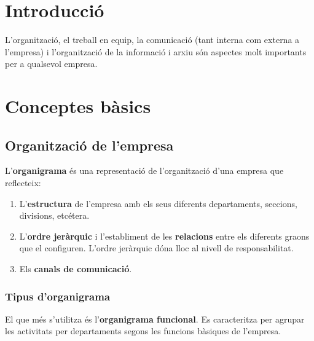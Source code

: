 \documentclass[
]{book}
\author{Fernando Verdú Primo}
\date{2022-01-03}
\begin{document}

\newpage

{
\setcounter{tocdepth}{1}
\tableofcontents
}
\hypertarget{introducciuxf3}{%
\chapter{Introducció}\label{introducciuxf3}}

L'organització, el treball en equip, la comunicació (tant interna com externa a l'empresa) i l'organització de la informació i arxiu són aspectes molt importants per a qualsevol empresa.

\hypertarget{conceptes-buxe0sics}{%
\chapter{Conceptes bàsics}\label{conceptes-buxe0sics}}

\hypertarget{organitzaciuxf3-de-lempresa}{%
\section{Organització de l'empresa}\label{organitzaciuxf3-de-lempresa}}

L'\textbf{organigrama} és una representació de l'organització d'una empresa que reflecteix:

\begin{enumerate}
\def\labelenumi{\alph{enumi}.}
\item
  L'\textbf{estructura} de l'empresa amb els seus diferents departaments, seccions, divisions, etcétera.
\item
  L'\textbf{ordre jeràrquic} i l'establiment de les \textbf{relacions} entre els diferents graons que el configuren. L'ordre jeràrquic dóna lloc al nivell de responsabilitat.
\item
  Els \textbf{canals de comunicació}.
\end{enumerate}

\hypertarget{tipus-dorganigrama}{%
\subsection{Tipus d'organigrama}\label{tipus-dorganigrama}}

El que més s'utilitza és l'\textbf{organigrama funcional}. Es caracteritza per agrupar les activitats per departaments segons les funcions bàsiques de l'empresa.
\end{document}

